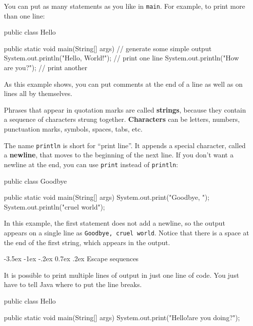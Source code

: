 \documentclass[12pt]{book}
\makeatletter
\theoremstyle{exercise}
\newcommand{\java}[1]{\verb"#1"}
\renewcommand{\section}{\@startsection{section}{1}{\z@}%
    {-3.5ex \@plus -1ex \@minus -.2ex}%
    {0.7ex \@plus.2ex}%
    {\normalfont\Large\bfseries}}
\newcommand{\java}[1]{\lstinline{#1}} %
\makeatother
\begin{document}
You can put as many statements as you like in \java{main}.
For example, to print more than one line:

\begin{code}
public class Hello {

    public static void main(String[] args) {
        // generate some simple output
        System.out.println("Hello, World!");  // print one line
        System.out.println("How are you?");   // print another
    }
}
\end{code}

As this example shows, you can put comments at the end of a line as well as on lines all by themselves.


Phrases that appear in quotation marks are called {\bf strings}, because they contain a sequence of characters strung together.
{\bf Characters} can be letters, numbers, punctuation marks, symbols, spaces, tabs, etc.


The name \java{println} is short for ``print line''.
It appends a special character, called a {\bf newline}, that moves to the beginning of the next line.
If you don't want a newline at the end, you can use \java{print} instead of \java{println}:

\begin{code}
public class Goodbye {

    public static void main(String[] args) {
        System.out.print("Goodbye, ");
        System.out.println("cruel world");
    }
}
\end{code}

\label{goodbye}

In this example, the first statement does not add a newline, so the output appears on a single line as {\tt Goodbye, cruel world}.
Notice that there is a space at the end of the first string, which appears in the output.


\section{Escape sequences}

It is possible to print multiple lines of output in just one line of code.
You just have to tell Java where to put the line breaks.

\begin{code}
public class Hello {

    public static void main(String[] args) {
        System.out.print("Hello!\nHow are you doing?\n");
    }
}
\end{code}
\end{document}
